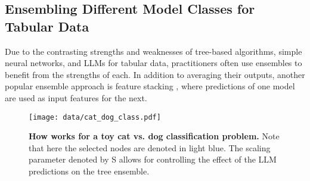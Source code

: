 \subsection{Ensembling Different Model Classes for Tabular Data}
Due to the contrasting strengths and weaknesses of tree-based algorithms, simple neural networks, and LLMs for tabular data, practitioners often use ensembles to benefit from the strengths of each. In addition to averaging their outputs, another popular ensemble approach is feature stacking \citep{erickson2020autogluon, levin2023transfer}, where predictions of one model are used as input features for the next.

\begin{figure}[h]
    \centering
    \texttt{[image: data/cat\_dog\_class.pdf]}
    \caption{\textbf{How \methodname works for a toy cat vs. dog classification problem.} Note that here the selected nodes are denoted in light blue. The scaling parameter denoted by S allows for controlling the effect of the LLM predictions on the tree ensemble.}
    \label{fig:cat_dog}
\end{figure}